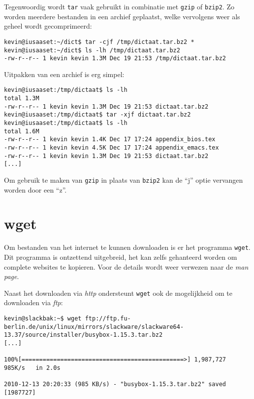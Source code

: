 Tegenwoordig wordt \texttt{tar} vaak gebruikt in combinatie met \texttt{gzip} of \texttt{bzip2}. Zo worden meerdere bestanden in een archief geplaatst, welke vervolgens weer als geheel wordt gecomprimeerd:
\begin{lstlisting}
kevin@iusaaset:~/dict$ tar -cjf /tmp/dictaat.tar.bz2 *
kevin@iusaaset:~/dict$ ls -lh /tmp/dictaat.tar.bz2 
-rw-r--r-- 1 kevin kevin 1.3M Dec 19 21:53 /tmp/dictaat.tar.bz2
\end{lstlisting}

Uitpakken van een archief is erg simpel:
\begin{lstlisting}
kevin@iusaaset:/tmp/dictaat$ ls -lh
total 1.3M
-rw-r--r-- 1 kevin kevin 1.3M Dec 19 21:53 dictaat.tar.bz2
kevin@iusaaset:/tmp/dictaat$ tar -xjf dictaat.tar.bz2 
kevin@iusaaset:/tmp/dictaat$ ls -lh
total 1.6M
-rw-r--r-- 1 kevin kevin 1.4K Dec 17 17:24 appendix_bios.tex
-rw-r--r-- 1 kevin kevin 4.5K Dec 17 17:24 appendix_emacs.tex
-rw-r--r-- 1 kevin kevin 1.3M Dec 19 21:53 dictaat.tar.bz2
[...]
\end{lstlisting}%
Om gebruik te maken van \texttt{gzip} in plaats van \texttt{bzip2} kan de ``j'' optie vervangen worden door een ``z''. 

\section{wget}
Om bestanden van het internet te kunnen downloaden is er het programma \texttt{wget}. Dit programma is ontzettend uitgebreid, het kan zelfs gehanteerd worden om complete websites te kopieren. Voor de details wordt weer verwezen naar de \emph{man page}. 

Naast het downloaden via \emph{http} ondersteunt \texttt{wget} ook de mogelijkheid om te downloaden via \emph{ftp}: 
\begin{lstlisting}
kevin@slackbak:~$ wget ftp://ftp.fu-berlin.de/unix/linux/mirrors/slackware/slackware64-13.37/source/installer/busybox-1.15.3.tar.bz2    
[...]

100%[==============================================>] 1,987,727    985K/s   in 2.0s    

2010-12-13 20:20:33 (985 KB/s) - "busybox-1.15.3.tar.bz2" saved [1987727]
\end{lstlisting}%
